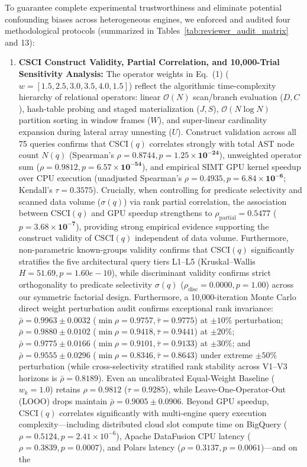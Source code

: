 \documentclass[10pt,a4paper]{article}
\begin{document}
To guarantee complete experimental trustworthiness and eliminate potential confounding biases across heterogeneous engines, we enforced and audited four methodological protocols (summarized in Tables~\ref{tab:reviewer_audit_matrix} and 13):
\begin{enumerate}[leftmargin=1.5em,itemsep=2pt]
    \item \textbf{CSCI Construct Validity, Partial Correlation, and 10,000-Trial Sensitivity Analysis:} The operator weights in Eq.~(1) ($w = [1.5, 2.5, 3.0, 3.5, 4.0, 1.5]$) reflect the algorithmic time-complexity hierarchy of relational operators: linear $\mathcal{O}(N)$ scan/branch evaluation ($D, C$), hash-table probing and staged materialization ($J, S$), $\mathcal{O}(N \log N)$ partition sorting in window frames ($W$), and super-linear cardinality expansion during lateral array unnesting ($U$). Construct validation across all 75 queries confirms that $\text{CSCI}(q)$ correlates strongly with total AST node count $N(q)$ (Spearman's $\rho = \mathbf{0.8744}, p = \mathbf{1.25 \times 10^{-24}}$), unweighted operator sum ($\rho = \mathbf{0.9812}, p = \mathbf{6.57 \times 10^{-54}}$), and empirical SIMT GPU kernel speedup over CPU execution (unadjusted Spearman's $\rho = \mathbf{0.4935}, p = \mathbf{6.84 \times 10^{-6}}$; Kendall's $\tau = \mathbf{0.3575}$). Crucially, when controlling for predicate selectivity and scanned data volume ($\sigma(q)$) via rank partial correlation, the association between $\text{CSCI}(q)$ and GPU speedup strengthens to $\rho_{\text{partial}} = \mathbf{0.5477}$ ($p = \mathbf{3.68 \times 10^{-7}}$), providing strong empirical evidence supporting the construct validity of $\text{CSCI}(q)$ independent of data volume. Furthermore, non-parametric known-groups validity confirms that $\text{CSCI}(q)$ significantly stratifies the five architectural query tiers L1--L5 (Kruskal--Wallis $H = 51.69, p = 1.60e-10$), while discriminant validity confirms strict orthogonality to predicate selectivity $\sigma(q)$ ($\rho_{\text{disc}} = 0.0000, p = 1.00$) across our symmetric factorial design. Furthermore, a 10,000-iteration Monte Carlo direct weight perturbation audit confirms exceptional rank invariance: $\bar{\rho} = \mathbf{0.9963} \pm 0.0032$ ($\min \rho = 0.9757, \bar{\tau}=0.9775$) at $\pm 10\%$ perturbation; $\bar{\rho} = \mathbf{0.9880} \pm 0.0102$ ($\min \rho = 0.9418, \bar{\tau}=0.9441$) at $\pm 20\%$; $\bar{\rho} = \mathbf{0.9775} \pm 0.0166$ ($\min \rho = 0.9101, \bar{\tau}=0.9133$) at $\pm 30\%$; and $\bar{\rho} = \mathbf{0.9555} \pm 0.0296$ ($\min \rho = 0.8346, \bar{\tau}=0.8643$) under extreme $\pm 50\%$ perturbation (while cross-selectivity stratified rank stability across V1--V3 horizons is $\bar{\rho}=0.8189$). Even an uncalibrated Equal-Weight Baseline ($w_k = 1.0$) retains $\rho = \mathbf{0.9812}$ ($\tau = 0.9285$), while Leave-One-Operator-Out (LOOO) drops maintain $\bar{\rho} = \mathbf{0.9005} \pm 0.0906$. Beyond GPU speedup, $\text{CSCI}(q)$ correlates significantly with multi-engine query execution complexity---including distributed cloud slot compute time on BigQuery ($\rho = 0.5124, p = 2.41\times 10^{-6}$), Apache DataFusion CPU latency ($\rho = 0.3839, p = 0.0007$), and Polars latency ($\rho = 0.3137, p = 0.0061$)---and on the 
\end{enumerate}
\end{document}
